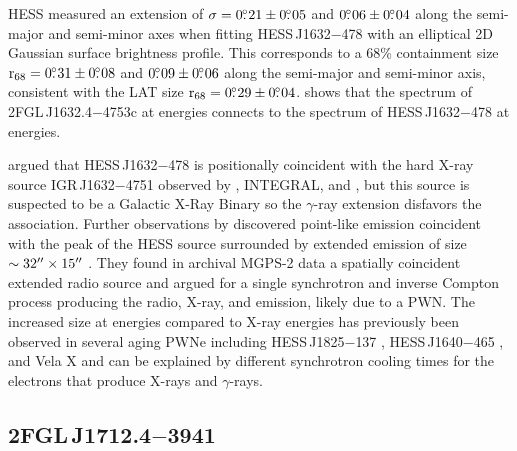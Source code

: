 \ac{HESS} measured an extension of $\sigma=0\mbox{$.\!\!^\circ$}21\pm0\mbox{$.\!\!^\circ$}05$ and
$0\mbox{$.\!\!^\circ$}06\pm0\mbox{$.\!\!^\circ$}04$ along the semi-major and semi-minor axes when
fitting HESS\,J1632$-$478 with an elliptical 2D Gaussian surface
brightness profile.  This corresponds to a 68\% containment size
${\mathrm{r}_{68}}=0\mbox{$.\!\!^\circ$}31\pm0\mbox{$.\!\!^\circ$}08$ and $0\mbox{$.\!\!^\circ$}09\pm0\mbox{$.\!\!^\circ$}06$ along
the semi-major and semi-minor axis, consistent with the LAT size
${\mathrm{r}_{68}}=0\mbox{$.\!\!^\circ$}29\pm0\mbox{$.\!\!^\circ$}04$.   shows that
the spectrum of 2FGL\,J1632.4$-$4753c at \gev energies connects to the
spectrum of HESS\,J1632$-$478 at \tev energies.

\cite{aharonian_2006a_h.e.s.s.-survey} argued that HESS\,J1632$-$478
is positionally coincident with the hard X-ray source
IGR\,J1632$-$4751 observed by \asca, INTEGRAL, and \xmmnewton
\citep{sugizaki_2001a_faint-x-ray,tomsick_2003a_j16320-4751,rodriguez_2003a_xmm-newton-observation},
but this source is suspected to be a Galactic X-Ray Binary so the
$\gamma$-ray extension disfavors the association.  Further observations
by \xmmnewton discovered point-like emission coincident with the peak
of the \ac{HESS} source surrounded by extended emission of size
$\sim32\mbox{$^{\prime\prime}$}\times15\mbox{$^{\prime\prime}$}$ \citep{balbo_2010a_j1632-478:-energetic}.
They found in archival MGPS-2 data a spatially coincident extended
radio source \citep{murphy_2007a_second-epoch} and argued for a single
synchrotron and inverse Compton process producing the radio, X-ray, and \tev emission,
likely due to a PWN.  The increased size at \tev energies compared
to X-ray energies has previously been observed in several aging PWNe
including HESS\,J1825$-$137 \citep{gaensler_2003a_xmm-newton-observations,aharonian_2006a_energy-dependent},
HESS\,J1640$-$465 \citep{aharonian_2006a_h.e.s.s.-survey,funk_2007a_xmm-newton-observations},
and Vela X \citep{markwardt_1995a_x-ray-pulsar,aharonian_2006a_first-detection} and can be explained by
different synchrotron cooling times for the electrons that produce X-rays
and $\gamma$-rays.


\subsection{2FGL\,J1712.4$-$3941}

